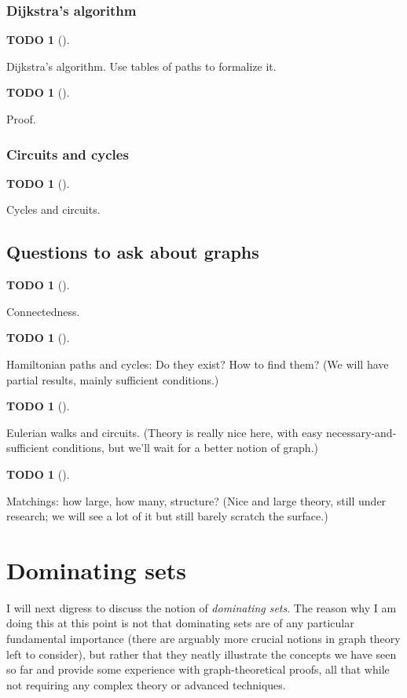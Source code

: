 \documentclass[numbers=enddot,12pt,final,onecolumn,notitlepage]{scrartcl}%
\theoremstyle{definition}
\newtheorem{quest}[theo]{TODO}
\newenvironment{todo}[1][]
{\begin{quest}[#1]\begin{leftbar}}
{\end{leftbar}\end{quest}}
\begin{document}
\subsubsection{Dijkstra's algorithm}

\begin{todo}
Dijkstra's algorithm. Use tables of paths to formalize it.
\end{todo}

\begin{todo}
Proof.
\end{todo}

\subsubsection{Circuits and cycles}

\begin{todo}
Cycles and circuits.
\end{todo}

\subsection{\label{sect.intro.teasers}Questions to ask about graphs}

\begin{todo}
Connectedness.
\end{todo}

\begin{todo}
Hamiltonian paths and cycles:
Do they exist? How to find them? (We will have partial results, mainly sufficient conditions.)
\end{todo}

\begin{todo}
Eulerian walks and circuits.
(Theory is really nice here, with easy necessary-and-sufficient conditions, but we'll wait for a better notion of graph.)
\end{todo}

\begin{todo}
Matchings:
how large, how many, structure? (Nice and large theory, still under research; we will see a lot of it but still barely scratch the surface.)
\end{todo}

\section{\label{sect.dominating}Dominating sets}

I will next digress to discuss the notion of \textit{dominating sets}.
The reason why I am doing this at this point is not that dominating
sets are of any particular fundamental importance (there are arguably
more crucial notions in graph theory left to consider), but rather
that they neatly illustrate the concepts we have seen so far and
provide some experience with graph-theoretical proofs, all that while
not requiring any complex theory or advanced techniques.
\end{document}
